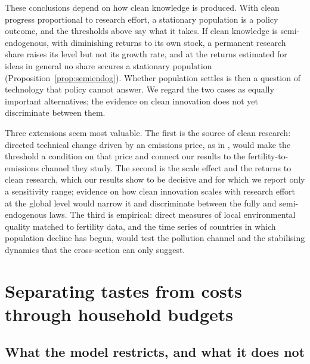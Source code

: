 \documentclass[11pt]{article}
\begin{document}
These conclusions depend on how clean knowledge is produced. With clean progress proportional to research
effort, a stationary population is a policy outcome, and the thresholds above say what it takes. If clean
knowledge is semi-endogenous, with diminishing returns to its own stock, a permanent research share
raises its level but not its growth rate, and at the returns estimated for ideas in general no share
secures a stationary population (Proposition~\ref{prop:semiendog}). Whether population settles is then a
question of technology that policy cannot answer. We regard the two cases as equally important
alternatives; the evidence on clean innovation does not yet discriminate between them.

Three extensions seem most valuable. The first is the source of clean research: directed technical change
driven by an emissions price, as in \citet{beulmann2025}, would make the threshold a condition on that
price and connect our results to the fertility-to-emissions channel they study. The second is the scale
effect and the returns to clean research, which our results show to be decisive and for which we report
only a sensitivity range; evidence on how clean innovation scales with research effort at the global
level would narrow it and discriminate between the fully and semi-endogenous laws. The third is
empirical: direct measures of local environmental quality matched to fertility data, and the time series
of countries in which population decline has begun, would test the pollution channel and the stabilising
dynamics that the cross-section can only suggest.

\appendix
\setcounter{table}{0}
\section{Separating tastes from costs through household budgets}
\label{app:budget}

\subsection{What the model restricts, and what it does not}
\label{sub:restrictions}
\end{document}
